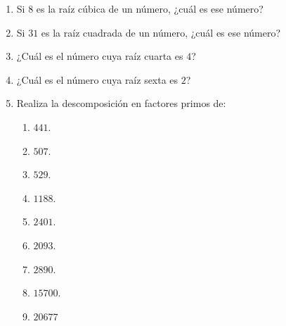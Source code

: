 \documentclass[12pt]{article}
\begin{document}
\begin{enumerate}
\item Si $8$ es la raíz cúbica de un número, ¿cuál es ese número?
\item Si $31$ es la raíz cuadrada de un número, ¿cuál es ese número?
\item ¿Cuál es el número cuya raíz cuarta es $4$?
\item ¿Cuál es el número cuya raíz sexta es $2$?
\item Realiza la descomposición en factores primos de:
\begin{enumerate}
\item $441$.
\item $507$.
\item $529$.
\item $1188$.
\item $2401$.
\item $2093$.
\item $2890$.
\item $15700$.
\item $20677$
\end{enumerate}
\end{enumerate}
\end{document}
